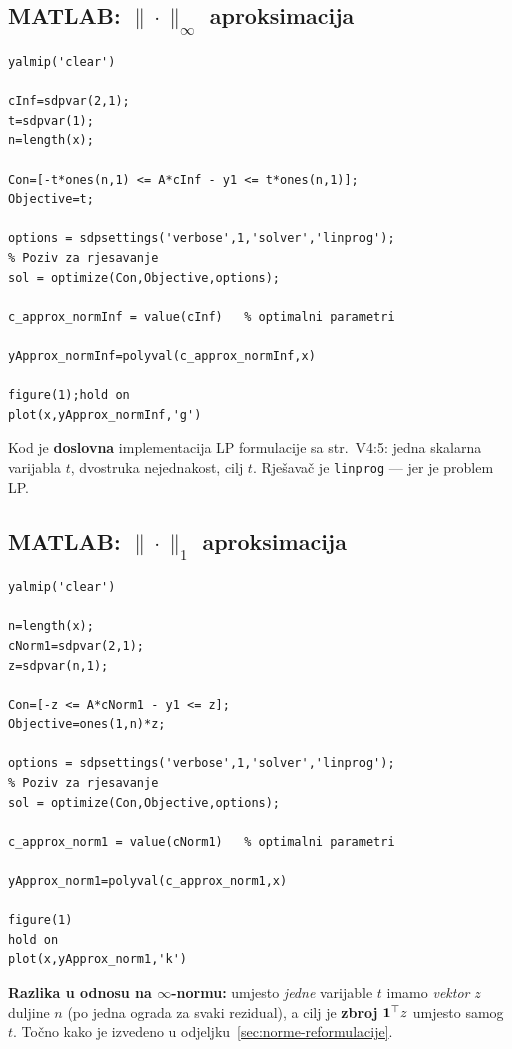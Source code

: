 \subsection{MATLAB: $\|\cdot\|_\infty$ aproksimacija}

\begin{verbatim}
yalmip('clear')

cInf=sdpvar(2,1);
t=sdpvar(1);
n=length(x);

Con=[-t*ones(n,1) <= A*cInf - y1 <= t*ones(n,1)];
Objective=t;

options = sdpsettings('verbose',1,'solver','linprog');
% Poziv za rjesavanje
sol = optimize(Con,Objective,options);

c_approx_normInf = value(cInf)   % optimalni parametri

yApprox_normInf=polyval(c_approx_normInf,x)

figure(1);hold on
plot(x,yApprox_normInf,'g')
\end{verbatim}

Kod je \textbf{doslovna} implementacija LP formulacije sa str.\ V4:5: jedna
skalarna varijabla $t$, dvostruka nejednakost, cilj $t$. Rješavač je
\texttt{linprog} --- jer je problem LP.

\subsection{MATLAB: $\|\cdot\|_1$ aproksimacija}

\begin{verbatim}
yalmip('clear')

n=length(x);
cNorm1=sdpvar(2,1);
z=sdpvar(n,1);

Con=[-z <= A*cNorm1 - y1 <= z];
Objective=ones(1,n)*z;

options = sdpsettings('verbose',1,'solver','linprog');
% Poziv za rjesavanje
sol = optimize(Con,Objective,options);

c_approx_norm1 = value(cNorm1)   % optimalni parametri

yApprox_norm1=polyval(c_approx_norm1,x)

figure(1)
hold on
plot(x,yApprox_norm1,'k')
\end{verbatim}

\textbf{Razlika u odnosu na $\infty$-normu:} umjesto \emph{jedne} varijable $t$
imamo \emph{vektor} $z$ duljine $n$ (po jedna ograda za svaki rezidual), a cilj
je \textbf{zbroj} $\mathbf{1}^{\top} z$ umjesto samog $t$. Točno kako je izvedeno u
odjeljku~\ref{sec:norme-reformulacije}.

